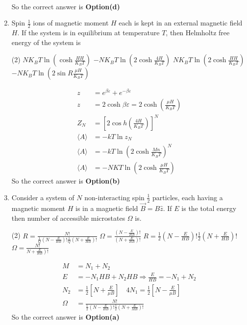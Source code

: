 \begin{enumerate}
\begin{answer}
\begin{align*}
	\end{align*}
	So the correct answer is \textbf{Option(d)}
\end{answer}
	\item Spin $\frac{1}{2}$ ions of magnetic moment $H$ each is kept in an external magnetic field $H$. If the system is in equilibrium at temperature $T$, then Helmholtz free energy of the system is 
		\begin{tasks}(2)
			\task[\textbf{a.}]$N K_{B} T \ln \left(\cosh \frac{H H}{K_{B} T}\right)$
			\task[\textbf{b.}]$-N K_{B} T \ln \left(2 \cosh \frac{4 H}{K_{B} T}\right)$
			\task[\textbf{c.}]$N K_{B} T \ln \left(2 \cosh \frac{H H}{K_{B} T}\right)$
			\task[\textbf{d.}] $-N K_{B} T \ln \left(2 \sin R \frac{\mu H}{K_{B} T}\right)$
		\end{tasks}
	\begin{answer}
		\begin{align*}
		z&=e^{\beta \varepsilon}+e^{-\beta \varepsilon}\\
		z&=2 \cosh \beta \varepsilon=2 \cosh \left(\frac{\mu H}{K_{B} T}\right)\\
		Z_{N}&=\left[2 \cos h\left(\frac{4 H}{K_{B} T}\right)\right]^{N}\\
		\langle A\rangle&=-k T \ln z_{N}\\
		\langle A\rangle&=-k T \ln \left(2 \cosh \frac{M n}{K_{B} T}\right)^{N}\\
		\langle A\rangle&=-N K T \ln \left(2 \cosh \frac{\mu H}{K_{B} T}\right)
		\end{align*}
		So the correct answer is \textbf{Option(b)}
	\end{answer}
\item Consider a system of $N$ non-interacting spin $\frac{1}{2}$ particles, each having a magnetic moment $H$ is in a magnetic field $\vec{B}=B \hat{z} $. If $E$ is the total energy then number of accessible microstates $\Omega$ is.
\begin{tasks}(2)
	\task[\textbf{a.}]$R=\frac{N !}{\frac{1}{Q}\left(N-\frac{E}{H B}\right) ! \frac{1}{Q}\left(N+\frac{E}{H B}\right) !}$
	\task[\textbf{b.}]$\Omega=\frac{\left(N-\frac{E}{H B}\right) !}{\left(N+\frac{E}{H B}\right) !}$
	\task[\textbf{c.}]$R=\frac{1}{2}\left(N-\frac{E}{H B}\right) ! \frac{1}{2}\left(N+\frac{E}{H B}\right) !$
	\task[\textbf{d.}] $\Omega=\frac{N !}{\left.N+\frac{E}{H B}\right) !}$
\end{tasks}
\begin{answer}
	\begin{align*}
	M&=N_{1}+N_{2}\\
	E&=-N_{1} H B+N_{2} H B \Rightarrow \frac{E}{H B}=-N_{1}+N_{2}\\
	N_{2}&=\frac{1}{2}\left[N+\frac{E}{\mu B}\right] \quad 4 N_{1}=\frac{1}{2}\left[N-\frac{E}{\mu B}\right]\\
	\Omega&=\frac{N !}{\frac{1}{2}\left(N-\frac{E}{H B}\right) ! \frac{1}{2}\left(N+\frac{E}{M B}\right) !}
	\end{align*}
	So the correct answer is \textbf{Option(a)}
\end{answer}	
	

\end{enumerate}
